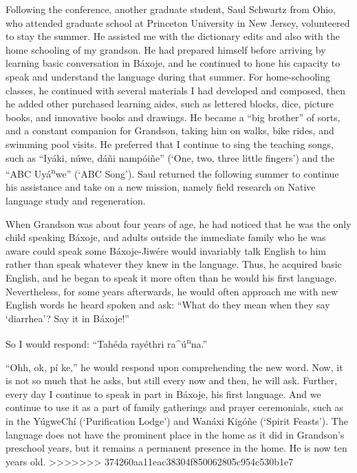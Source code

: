 \documentclass[output=paper]{LSP/langsci}
\begin{document}
Following the conference, another graduate student, Saul Schwartz from Ohio, who attended graduate school at Princeton University in New Jersey, volunteered to stay the summer. He assisted me with the dictionary edits and also with the home schooling of my grandson. He had prepared himself before arriving by learning basic conversation in B\'axoje, and he continued to hone his capacity to speak and understand the language during that summer. For home-schooling classes, he continued with several materials I had developed and composed, then he added other purchased learning aides, such as lettered blocks, dice, picture books, and innovative books and drawings. He became a ``big brother'' of sorts, and a constant companion for Grandson, taking him on walks, bike rides, and swimming pool visits. He preferred that I continue to sing the teaching songs, such as ``Iy\'aki, n\'uwe, d\'a\~ni namp\'oi\~ne'' (`One, two, three little fingers') and the ``ABC Uy\'a\textsuperscript{n}we'' (`ABC Song'). Saul returned the following summer to continue his assistance and take on a new mission, namely field research on Native language study and regeneration.  

When Grandson was about four years of age, he had noticed that he was the only child speaking B\'axoje, and adults outside the immediate family who he was aware could speak some B\'axoje-Jiw\'ere would invariably talk English to him rather than speak whatever they knew in the language. Thus, he acquired basic English, and he began to speak it more often than he would his first language. Nevertheless, for some years afterwards, he would often approach me with new English words he heard spoken and ask: ``What do they mean when they say `diarrhea'? Say it in B\'axoje!''

So I would respond: ``Tah\'eda ray\'ethri ra\^{ }\'u\textsuperscript{n}na.''
	
``Ohh, ok, p\'i ke,'' he would respond upon comprehending the new word. Now, it is not so much that he asks, but still every now and then, he will ask. Further, every day I continue to speak in part in B\'axoje, his first language. And we continue to use it as a part of family gatherings and prayer ceremonials, such as in the Y\'ugweCh\'i (`Purification Lodge') and Wan\'axi Kig\'o\~ne (`Spirit Feasts'). The language does not have the prominent place in the home as it did in Grandson's preschool years, but it remains a permanent presence in the home. He is now ten years old.
>>>>>>> 374260aa11eac38304f850062805c954c530b1e7
\end{document}
